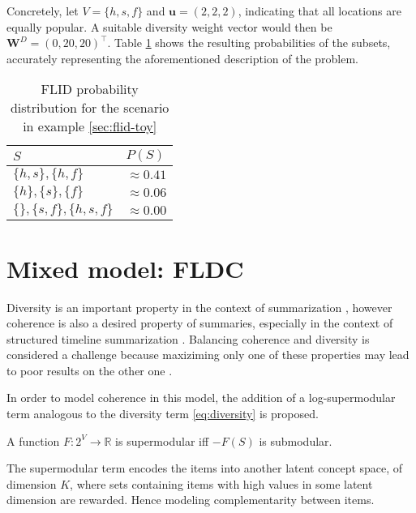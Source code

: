 Concretely, let $V = \{h, s, f\}$ and $\mathbf{u} = \left(2, 2, 2\right)$, indicating that all locations are equally popular. A suitable diversity weight vector would then be $\mathbf{W}^{D} = \left(0, 20, 20\right)^{\intercal}$. Table \ref{tab:flid-toy-probs} shows the resulting probabilities of the subsets, accurately representing the aforementioned description of the problem.

\begin{table}
  \centering
  \caption{FLID probability distribution for the scenario in example \ref{sec:flid-toy}}
  \begin{tabular}{@{}ll@{}}
    \toprule
      $S$ & $P(S)$  \\
    \midrule
      $\{h,s\}, \{h,f\}$ & $\approx 0.41$ \\
      $\{h\}, \{s\}, \{f\}$ & $\approx 0.06$ \\
      $\{\}, \{s,f\}, \{h,s,f\}$ & $\approx 0.00$ \\
    \bottomrule
  \end{tabular}
  \label{tab:flid-toy-probs}
\end{table}

\section{Mixed model: FLDC}

Diversity is an important property in the context of summarization \cite{tschiatschek16learning}, however coherence is also a desired property of summaries, especially in the context of structured timeline summarization \cite{Yan:2011:ETS:2009916.2010016}. Balancing coherence and diversity is considered a challenge because maxiziming only one of these properties may lead to poor results on the other one \cite{Shahaf2012}.

In order to model coherence in this model, the addition of a log-supermodular term analogous to the diversity term \ref{eq:diversity} is proposed.

\begin{definition}
  \label{def:supermodularity}
  A function $F:2^V \rightarrow \mathbb{R}$ is supermodular iff $-F(S)$ is submodular.
\end{definition}

The supermodular term encodes the items into another latent concept space, of dimension $K$, where sets containing items with high values in some latent dimension are rewarded. Hence modeling complementarity between items.

